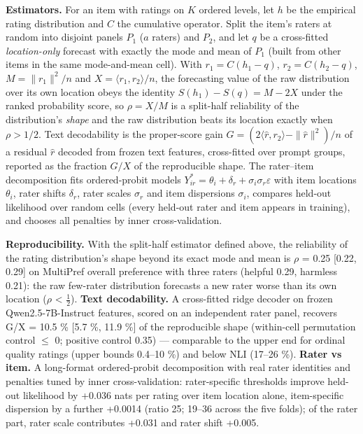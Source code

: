 \documentclass{article}
\begin{document}
\textbf{Estimators.} For an item with ratings on \(K\) ordered levels, let \(h\) be the empirical rating distribution and \(C\) the cumulative operator. Split the item's raters at random into disjoint panels \(P_1\) (\(a\) raters) and \(P_2\), and let \(q\) be a cross-fitted \emph{location-only} forecast with exactly the mode and mean of \(P_1\) (built from other items in the same mode-and-mean cell). With \(r_1 = C(h_1 - q)\), \(r_2 = C(h_2 - q)\), \(M = \|r_1\|^2/n\) and \(X = \langle r_1, r_2\rangle/n\), the forecasting value of the raw distribution over its own location obeys the identity \(S(h_1) - S(q) = M - 2X\) under the ranked probability score, so \(\rho = X/M\) is a split-half reliability of the distribution's \emph{shape} and the raw distribution beats its location exactly when \(\rho > 1/2\). Text decodability is the proper-score gain \(G = (2\langle \hat r, r_2\rangle - \|\hat r\|^2)/n\) of a residual \(\hat r\) decoded from frozen text features, cross-fitted over prompt groups, reported as the fraction \(G/X\) of the reproducible shape. The rater--item decomposition fits ordered-probit models \(Y^*_{ir} = \theta_i + \delta_r + \sigma_i\sigma_r\varepsilon\) with item locations \(\theta_i\), rater shifts \(\delta_r\), rater scales \(\sigma_r\) and item dispersions \(\sigma_i\), compares held-out likelihood over random cells (every held-out rater and item appears in training), and chooses all penalties by inner cross-validation.

\textbf{Reproducibility.} With the split-half estimator defined above, the reliability of the rating distribution's shape beyond its exact mode and mean is $\rho$ = 0.25 {[}0.22, 0.29{]} on MultiPref overall preference with three raters (helpful 0.29, harmless 0.21): the raw few-rater distribution forecasts a new rater worse than its own location ($\rho$ \textless{} $\tfrac12$). \textbf{Text decodability.} A cross-fitted ridge decoder on frozen Qwen2.5-7B-Instruct features, scored on an independent rater panel, recovers G/X = 10.5 \% {[}5.7 \%, 11.9 \%{]} of the reproducible shape (within-cell permutation control $\leq$ 0; positive control 0.35) --- comparable to the upper end for ordinal quality ratings (upper bounds 0.4--10 \%) and below NLI (17--26 \%). \textbf{Rater vs item.} A long-format ordered-probit decomposition with real rater identities and penalties tuned by inner cross-validation: rater-specific thresholds improve held-out likelihood by +0.036 nats per rating over item location alone, item-specific dispersion by a further +0.0014 (ratio 25; 19--36 across the five folds); of the rater part, rater scale contributes +0.031 and rater shift +0.005.
\end{document}
